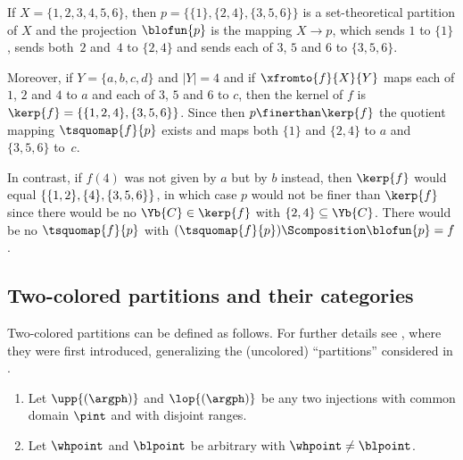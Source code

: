 \documentclass[pdftex]{sigma}
\numberwithin{equation}{section}
\begin{document}
\begin{Example}
      \newcommand{\themap}{f}
      \newcommand{\domset}{X}
      \newcommand{\codset}{Y}
      \newcommand{\thepartition}{p}
      \newcommand{\othermap}{g}
      \newcommand{\block}{\Yb{C}}
      If $\domset=\{1,2,3,4,5,6\}$, then $\thepartition=\{\{1\},\{2,4\},\{3,5,6\}\}$ is a set-theoretical partition of $\domset$ and the projection $\blofun{\thepartition}$ is the mapping $\domset\to \thepartition$, which sends $1$ to $\{1\}$, sends both~$2$ and~$4$ to $\{2,4\}$ and sends each of $3$, $5$ and $6$ to $\{3,5,6\}$.

      Moreover, if  $\codset=\{a,b,c,d\}$ and $|\codset|=4$ and if $\xfromto{\themap}{\domset}{\codset}$ maps each of $1$, $2$ and $4$ to $a$ and each of $3$, $5$ and $6$ to $c$, then the kernel of $\themap$ is $\kerp{\themap}=\{\{1,2,4\},\{3,5,6\}\}$. Since then $\thepartition\finerthan\kerp{\themap}$ the quotient mapping $\tsquomap{\themap}{\thepartition}$ exists and maps both  $\{1\}$ and $\{2,4\}$ to $a$ and~$\{3,5,6\}$ to~$c$.

      In contrast, if $\themap(4)$ was not given by $a$ but by $b$ instead, then $\kerp{\themap}$ would equal $\{\{1,2\},\{4\},\break\{3,5,6\}\}$, in which case $\thepartition$ would not be finer than  $\kerp{\themap}$ since there would be no $\block\in\kerp{\themap}$ with $\{2,4\}\subseteq \block$. There would be no $\tsquomap{\themap}{\thepartition}$ with $(\tsquomap{\themap}{\thepartition})\Scomposition\blofun{\thepartition}=\themap$.
\end{Example}

\subsection{Two-colored partitions and their categories}
\label{section:easy-partitions}
Two-co\-lo\-red partitions can be defined as follows. For further details see \cite{TarragoWeber2018}, where they  were first introduced, generalizing the (uncolored) ``partitions'' considered in \cite{BanicaSpeicher2009}.
\begin{Assumptions}\quad
  \begin{enumerate}\itemsep=0pt
  \item Let $\upp{(\argph)}$ and $\lop{(\argph)}$ be any two injections with common domain  $\pint$ and with disjoint ranges.
  \item  Let $\whpoint$ and $\blpoint $ be arbitrary with $\whpoint\neq \blpoint$.
  \end{enumerate}
\end{Assumptions}
\end{document}

